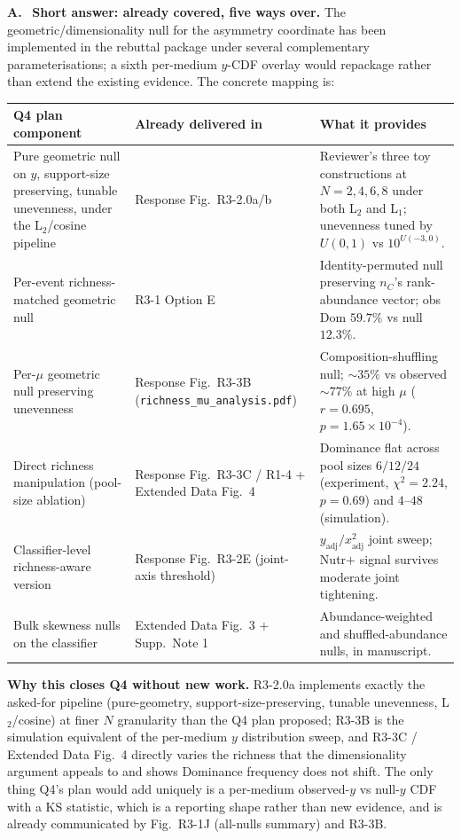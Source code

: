 \documentclass[11pt]{article}
\newcommand{\answerlabel}{\par\noindent\textbf{A.}\ }
\begin{document}
\answerlabel
\textbf{Short answer: already covered, five ways over.} The geometric/dimensionality null for the asymmetry coordinate has been implemented in the rebuttal package under several complementary parameterisations; a sixth per-medium $y$-CDF overlay would repackage rather than extend the existing evidence. The concrete mapping is:

\begin{center}
\small
\begin{tabular}{p{} p{} p{}}
\toprule
\textbf{Q4 plan component} & \textbf{Already delivered in} & \textbf{What it provides} \\
\midrule
Pure geometric null on $y$, support-size preserving, tunable unevenness, under the L$_2$/cosine pipeline &
Response Fig.~R3-2.0a/b &
Reviewer's three toy constructions at $N = 2, 4, 6, 8$ under both L$_2$ and L$_1$; unevenness tuned by $U(0,1)$ vs $10^{U(-3,0)}$. \\
Per-event richness-matched geometric null &
R3-1 Option E &
Identity-permuted null preserving $n_C$'s rank-abundance vector; obs Dom $59.7\%$ vs null $12.3\%$. \\
Per-$\mu$ geometric null preserving unevenness &
Response Fig.~R3-3B \newline (\texttt{richness\_mu\_analysis.pdf}) &
Composition-shuffling null; $\sim 35\%$ vs observed $\sim 77\%$ at high $\mu$ ($r = 0.695$, $p = 1.65 \times 10^{-4}$). \\
Direct richness manipulation (pool-size ablation) &
Response Fig.~R3-3C / R1-4 \newline + Extended Data Fig.~4 &
Dominance flat across pool sizes $6/12/24$ (experiment, $\chi^2 = 2.24$, $p = 0.69$) and $4$--$48$ (simulation). \\
Classifier-level richness-aware version &
Response Fig.~R3-2E (joint-axis threshold) &
$y_{\mathrm{adj}} / x^2_{\mathrm{adj}}$ joint sweep; Nutr$+$ signal survives moderate joint tightening. \\
Bulk skewness nulls on the classifier &
Extended Data Fig.~3 + Supp.~Note 1 &
Abundance-weighted and shuffled-abundance nulls, in manuscript. \\
\bottomrule
\end{tabular}
\end{center}

\noindent\textbf{Why this closes Q4 without new work.}
R3-2.0a implements exactly the asked-for pipeline (pure-geometry, support-size-preserving, tunable unevenness, L$_2$/cosine) at finer $N$ granularity than the Q4 plan proposed; R3-3B is the simulation equivalent of the per-medium $y$ distribution sweep, and R3-3C / Extended Data Fig.~4 directly varies the richness that the dimensionality argument appeals to and shows Dominance frequency does not shift. The only thing Q4's plan would add uniquely is a per-medium observed-$y$ vs null-$y$ CDF with a KS statistic, which is a reporting shape rather than new evidence, and is already communicated by Fig.~R3-1J (all-nulls summary) and R3-3B.
\end{document}
